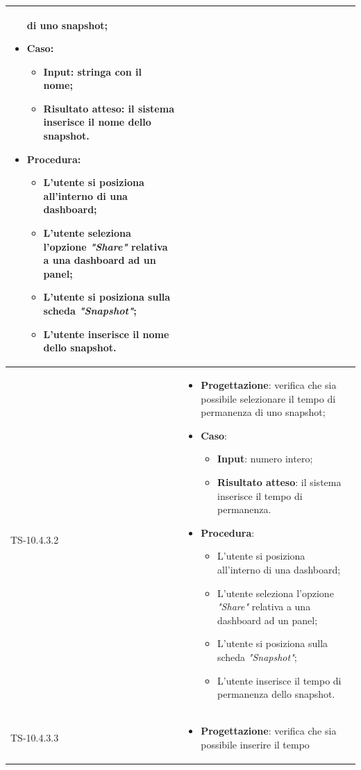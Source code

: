 \begin{longtable}{|C{2.5cm}|C{13cm}|}
\begin{itemize}
	di uno snapshot;
	\item \textbf{Caso}: 
	\begin{itemize}
		\item \textbf{Input}: stringa con il nome;
		\item \textbf{Risultato atteso}: il sistema inserisce il nome dello snapshot.
	\end{itemize}
	\item \textbf{Procedura}:
	\begin{itemize}
		\item L'utente si posiziona all'interno di una dashboard;
		\item L'utente seleziona l'opzione \emph{"Share"} relativa a una dashboard ad un panel;
		\item L'utente si posiziona sulla scheda \emph{"Snapshot"};
		\item L'utente inserisce il nome dello snapshot.
	\end{itemize} 
\end{itemize}
	  \\
	\hline
	{TS-10.4.3.2} &
\begin{itemize}
	\item \textbf{Progettazione}: verifica che sia possibile selezionare il
	tempo di permanenza di uno snapshot;
	\item \textbf{Caso}: 
	\begin{itemize}
		\item \textbf{Input}: numero intero;
		\item \textbf{Risultato atteso}: il sistema inserisce il tempo di permanenza.
	\end{itemize}
	\item \textbf{Procedura}:
	\begin{itemize}
		\item L'utente si posiziona all'interno di una dashboard;
		\item L'utente seleziona l'opzione \emph{"Share"} relativa a una dashboard ad un panel;
		\item L'utente si posiziona sulla scheda \emph{"Snapshot"};
		\item L'utente inserisce il tempo di permanenza dello snapshot.
	\end{itemize} 
\end{itemize}
	  \\
	\hline
	{TS-10.4.3.3} & 
\begin{itemize}
	\item \textbf{Progettazione}: verifica che sia possibile inserire il tempo

\end{itemize}
\end{longtable}
